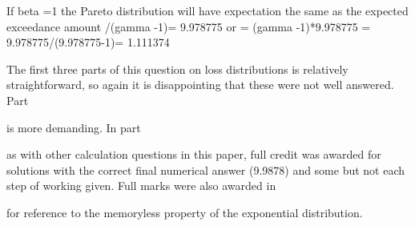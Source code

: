 \documentclass[a4paper,12pt]{article}
\begin{document}
\item 
If beta =1 the Pareto distribution will have expectation the same as the expected exceedance amount
\gamma /(gamma -1)= 9.978775 
or
\gamma = (gamma -1)*9.978775 
\gamma= 9.978775/(9.978775-1)= 1.111374 

\newpage

The first three parts of this question on loss distributions is relatively straightforward, so again it is disappointing that these were not well answered.
Part \item  is more demanding.
\medskip 
In part \item   as with other calculation questions in this paper, full credit was awarded for solutions with the correct final numerical answer (9.9878) and some but not each step of working given.
Full marks were also awarded in \item   for reference to the memoryless property of the exponential distribution.
\end{document}
